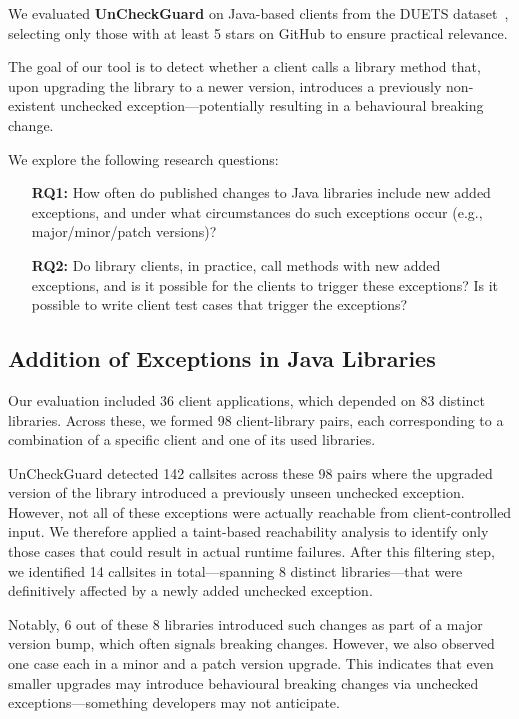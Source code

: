 We evaluated \textbf{UnCheckGuard} on Java-based clients from the DUETS dataset~\cite{durieux21:_duets}, selecting only those with at least 5 stars on GitHub to ensure practical relevance.

The goal of our tool is to detect whether a client calls a library method that, upon upgrading the library to a newer version, introduces a previously non-existent unchecked exception—potentially resulting in a behavioural breaking change.

We explore the following research questions:

\begin{itemize}
  \item[\textbf{RQ1:}] How often do published changes to Java libraries include new added exceptions, and under what circumstances do such exceptions occur (e.g., major/minor/patch versions)?
  \item[\textbf{RQ2:}] Do library clients, in practice, call methods with new added exceptions, and is it possible for the clients to trigger these exceptions? Is it possible to write client test cases that trigger the exceptions?
\end{itemize}

\subsection{Addition of Exceptions in Java Libraries}

Our evaluation included 36 client applications, which depended on 83 distinct libraries. Across these, we formed 98 client-library pairs, each corresponding to a combination of a specific client and one of its used libraries. 

UnCheckGuard detected 142 callsites across these 98 pairs where the upgraded version of the library introduced a previously unseen unchecked exception. However, not all of these exceptions were actually reachable from client-controlled input. We therefore applied a taint-based reachability analysis to identify only those cases that could result in actual runtime failures. After this filtering step, we identified 14 callsites in total—spanning 8 distinct libraries—that were definitively affected by a newly added unchecked exception. 

Notably, 6 out of these 8 libraries introduced such changes as part of a major version bump, which often signals breaking changes. However, we also observed one case each in a minor and a patch version upgrade. This indicates that even smaller upgrades may introduce behavioural breaking changes via unchecked exceptions—something developers may not anticipate.

